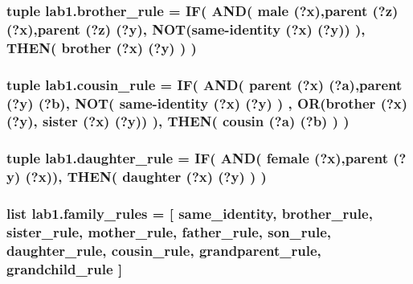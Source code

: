 \subsubsection[{brother\+\_\+rule}]{\setlength{\rightskip}{0pt plus 5cm}tuple lab1.\+brother\+\_\+rule = {\bf I\+F}( {\bf A\+N\+D}( \textquotesingle{}male (?x)\textquotesingle{},\textquotesingle{}parent (?z) (?x)\textquotesingle{},\textquotesingle{}parent (?z) (?y)\textquotesingle{}, {\bf N\+O\+T}(\textquotesingle{}same-\/identity (?x) (?y)\textquotesingle{}) ), {\bf T\+H\+E\+N}( \textquotesingle{}brother (?x) (?y)\textquotesingle{} ) )}\label{namespacelab1_a2a12c1747bc9ea2b9438e91ff8de062f}
\hypertarget{namespacelab1_aea4380bf61363b1b23cf9a7d7a5c81eb}{}
\subsubsection[{cousin\+\_\+rule}]{\setlength{\rightskip}{0pt plus 5cm}tuple lab1.\+cousin\+\_\+rule = {\bf I\+F}( {\bf A\+N\+D}( \textquotesingle{}parent (?x) (?a)\textquotesingle{},\textquotesingle{}parent (?y) (?b)\textquotesingle{}, {\bf N\+O\+T}( \textquotesingle{}same-\/identity (?x) (?y)\textquotesingle{} ) , {\bf O\+R}(\textquotesingle{}brother (?x) (?y)\textquotesingle{}, \textquotesingle{}sister (?x) (?y)\textquotesingle{}) ), {\bf T\+H\+E\+N}( \textquotesingle{}cousin (?a) (?b)\textquotesingle{} ) )}\label{namespacelab1_aea4380bf61363b1b23cf9a7d7a5c81eb}
\hypertarget{namespacelab1_a326d672f8f3e2d6fbd42c1f9208b25c6}{}
\subsubsection[{daughter\+\_\+rule}]{\setlength{\rightskip}{0pt plus 5cm}tuple lab1.\+daughter\+\_\+rule = {\bf I\+F}( {\bf A\+N\+D}( \textquotesingle{}female (?x)\textquotesingle{},\textquotesingle{}parent (?y) (?x)\textquotesingle{}), {\bf T\+H\+E\+N}( \textquotesingle{}daughter (?x) (?y)\textquotesingle{} ) )}\label{namespacelab1_a326d672f8f3e2d6fbd42c1f9208b25c6}
\hypertarget{namespacelab1_a0385b05a0f007b7449d100d5f61a43a6}{}
\subsubsection[{family\+\_\+rules}]{\setlength{\rightskip}{0pt plus 5cm}list lab1.\+family\+\_\+rules = \mbox{[} {\bf same\+\_\+identity}, {\bf brother\+\_\+rule}, {\bf sister\+\_\+rule}, {\bf mother\+\_\+rule}, {\bf father\+\_\+rule}, {\bf son\+\_\+rule}, {\bf daughter\+\_\+rule}, {\bf cousin\+\_\+rule}, {\bf grandparent\+\_\+rule}, {\bf grandchild\+\_\+rule} \mbox{]}}\label{namespacelab1_a0385b05a0f007b7449d100d5f61a43a6}
\hypertarget{namespacelab1_abc6ad6a1170b6579aaeb533235ca881a}{}
